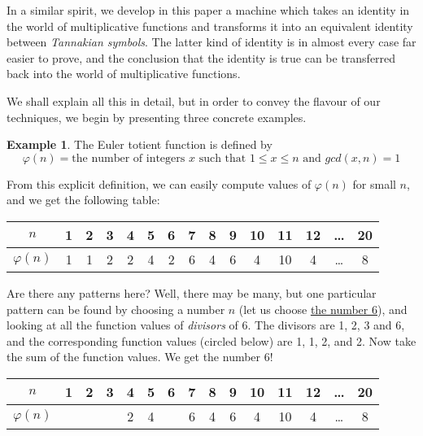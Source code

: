 \documentclass[a4paper]{article}
\theoremstyle{definition}
\newtheorem{example}{Example}[section]
\theoremstyle{remark}
\begin{document}
In a similar spirit, we develop in this paper a machine which takes an identity in the world of multiplicative functions and transforms it into an equivalent identity between \emph{Tannakian symbols}. The latter kind of identity is in almost every case far easier to prove, and the conclusion that the identity is true can be transferred back into the world of multiplicative functions.

We shall explain all this in detail, but in order to convey the flavour of our techniques, we begin by presenting three concrete examples. 

\begin{example}
The Euler totient function is defined by
$$  \varphi(n) = \textrm{the number of integers $x$ such that $1 \leq x \leq n$ and $gcd(x, n) = 1$}  $$

From this explicit definition, we can easily compute values of $\varphi(n)$ for small $n$, and we get the following table:

\vspace{6pt}
\begin{tabular}{  | c || c | c | c | c | c | c | c | c | c | c | c | c | c | c |  }
  \hline			
  $n$ & 1 & 2 & 3 & 4 & 5 & 6 & 7 & 8 & 9 & 10 & 11 & 12 & \ldots & 20  \\
  \hline
  $\varphi(n) $ & 1 & 1 & 2 & 2 & 4 & 2 & 6 & 4 & 6 & 4 & 10 & 4 & \ldots & 8  \\
  \hline  
\end{tabular}
\vspace{6pt}

Are there any patterns here? Well, there may be many, but one particular pattern can be found by choosing a number $n$ (let us choose \underline{the number 6}), and looking at all the function values of \emph{divisors} of 6. The divisors are 1, 2, 3 and 6, and the corresponding function values (circled below) are 1, 1, 2, and 2. Now take the sum of the function values. We get the number 6!

\vspace{6pt}
\begin{tabular}{  | c || c | c | c | c | c | c | c | c | c | c | c | c | c | c |  }
  \hline			
  $n$ & \bf{1} & \bf{2} & \bf{3} & 4 & 5 & \bf{6} & 7 & 8 & 9 & 10 & 11 & 12 & \ldots & 20  \\
  \hline
  $\varphi(n) $ & \raisebox{.5pt}{\textcircled{\raisebox{-.9pt} {1}}} & \raisebox{.5pt}{\textcircled{\raisebox{-.9pt} {1}}} & \raisebox{.5pt}{\textcircled{\raisebox{-.9pt} {2}}} & 2 & 4 & \raisebox{.5pt}{\textcircled{\raisebox{-.9pt} {2}}} & 6 & 4 & 6 & 4 & 10 & 4 & \ldots & 8  \\
  \hline  
\end{tabular}
\vspace{6pt}


\end{example}
\end{document}
